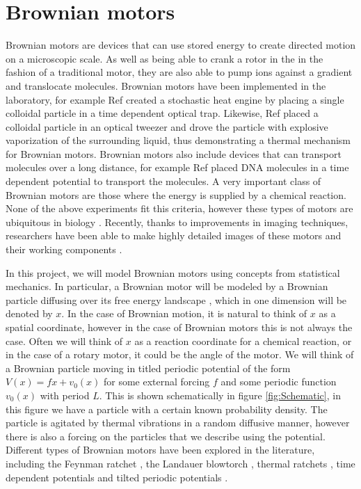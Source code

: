 \section{Brownian motors}
Brownian motors are devices that can use stored energy to create directed motion on a microscopic scale. As well as being able to crank a rotor in the in the fashion of a traditional motor, they are also able to pump ions against a gradient and translocate molecules. Brownian motors have been implemented in the laboratory, for example Ref \cite{BlickleBechinger2011} created a stochastic heat engine by placing a single colloidal particle in a time dependent optical trap. Likewise, Ref \cite{Pedro2014} placed a colloidal particle in an optical tweezer and drove the particle with explosive vaporization of the surrounding liquid, thus demonstrating a thermal mechanism for Brownian motors. Brownian motors also include devices that can transport molecules over a long distance, for example Ref \cite{JoelBader1999} placed DNA molecules in a time dependent potential to transport the molecules. A very important class of Brownian motors are those where the energy is supplied by a chemical reaction. None of the above experiments fit this criteria, however these types of motors are ubiquitous in biology \cite{PhillipsQuakeMay2006, Magnasco1994}. Recently, thanks to improvements in imaging techniques, researchers have been able to make highly detailed images of these motors and their working components \cite{YiWeiChang2016}.

In this project, we will model Brownian motors using concepts from statistical mechanics. In particular, a Brownian motor will be modeled by a Brownian particle diffusing over its free energy landscape \cite{Reimann2001}, which in one dimension will be denoted by $x$. In the case of Brownian motion, it is natural to think of $x$ as a spatial coordinate, however in the case of Brownian motors this is not always the case. Often we will think of $x$ as a reaction coordinate for a chemical reaction, or in the case of a rotary motor, it could be the angle of the motor. We will think of a Brownian particle moving in titled periodic potential of the form $V(x) = f x + v_0(x)$ for some external forcing $f$ and some periodic function $v_0(x)$ with period $L$. This is shown schematically in figure \ref{fig:Schematic}, in this figure we have a particle with a certain known probability density. The particle is agitated by thermal vibrations in a random diffusive manner, however there is also a forcing on the particles that we describe using the potential. Different types of Brownian motors have been explored in the literature, including the Feynman ratchet \cite{Feynman1963}, the Landauer blowtorch \cite{Landauer1988}, thermal ratchets \cite{Pedro2014}, time dependent potentials \cite{JoelBader1999,BlickleBechinger2011} and tilted periodic potentials \cite{Leibler1993,Magnasco1994}.

